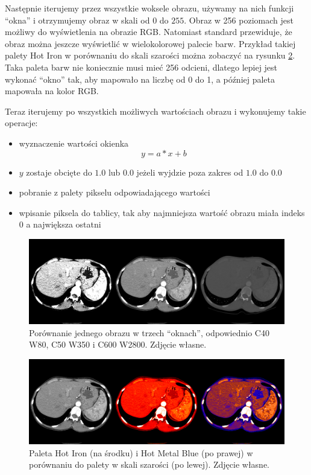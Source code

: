 \par
Następnie iterujemy przez wszystkie woksele obrazu, używamy na nich funkcji \enquote{okna} i otrzymujemy obraz w skali od $0$ do $255$.
Obraz w 256 poziomach jest możliwy do wyświetlenia na obrazie RGB.
Natomiast standard \DICOM przewiduje, że obraz można jeszcze wyświetlić w wielokolorowej palecie barw.
Przykład takiej palety Hot Iron w porównaniu do skali szarości można zobaczyć na rysunku \ref{fig:algorithm-pixmap-monochrome-palette}.
Taka paleta barw nie koniecznie musi mieć 256 odcieni, dlatego lepiej jest wykonać \enquote{okno} tak, aby mapowało na liczbę od 0 do 1, a później paleta mapowała na kolor RGB.
\par
Teraz iterujemy po wszystkich możliwych wartościach obrazu i wykonujemy takie operacje:
\begin{itemize}
    \item wyznaczenie wartości okienka
          \[y = a * x + b\]
    \item $y$ zostaje obcięte do $1.0$ lub $0.0$ jeżeli wyjdzie poza zakres od $1.0$ do $0.0$
    \item pobranie z palety pikselu odpowiadającego wartości
    \item wpisanie piksela do tablicy, tak aby najmniejsza wartość obrazu miała indeks $0$ a największa ostatni
\end{itemize}


\begin{figure}[!htbp]
    \centering
    \includegraphics[width=\textwidth]{img/monochrome-002.png}
    \caption{Porównanie jednego obrazu w trzech \enquote{oknach}, odpowiednio C40 W80, C50 W350 i C600 W2800. Zdjęcie własne.}
    \label{fig:algorithm-pixmap-monochrome-multiwindow}
\end{figure}

\begin{figure}[!htbp]
    \centering
    \includegraphics[width=\textwidth]{img/monochrome-003.png}
    \caption{Paleta Hot Iron (na środku) i Hot Metal Blue (po prawej) w porównaniu do palety w skali szarości (po lewej). Zdjęcie własne.}
    \label{fig:algorithm-pixmap-monochrome-palette}
\end{figure}


